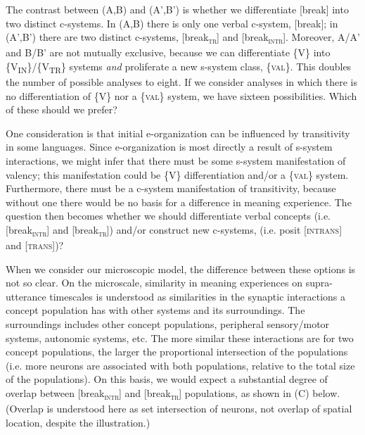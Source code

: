   The contrast between (A,B) and (A',B') is whether we differentiate [break] into two distinct c-systems. In (A,B) there is only one verbal c-system, [break]; in (A',B') there are two distinct c-systems, [break\textsc{\textsubscript{tr}}] and [break\textsc{\textsubscript{intr}}]. Moreover, A/A' and B/B' are not mutually exclusive, because we can differentiate \{V\} into \{V\textsubscript{IN}\}/\{V\textsubscript{TR}\} systems \textit{and} proliferate a new s-system class, \{\textsc{val}\}. This doubles the number of possible analyses to eight. If we consider analyses in which there is no differentiation of \{V\} nor a \{\textsc{val}\} system, we have sixteen possibilities. Which of these should we prefer? 

  One consideration is that initial e-organization can be influenced by transitivity in some languages. Since e-organization is most directly a result of s-system interactions, we might infer that there must be some s-system manifestation of valency; this manifestation could be \{V\} differentiation and/or a \{\textsc{val}\} system. Furthermore, there must be a c-system manifestation of transitivity, because without one there would be no basis for a difference in meaning experience. The question then becomes whether we should differentiate verbal concepts (i.e. [break\textsc{\textsubscript{intr}}] and [break\textsc{\textsubscript{tr}}]) and/or construct new c-systems, (i.e. posit [\textsc{intrans}] and [\textsc{trans}])?

  When we consider our microscopic model, the difference between these options is not so clear. On the microscale, similarity in meaning experiences on supra-utterance timescales is understood as similarities in the synaptic interactions a concept population has with other systems and its surroundings. The surroundings includes other concept populations, peripheral sensory/motor systems, autonomic systems, etc. The more similar these interactions are for two concept populations, the larger the proportional intersection of the populations (i.e. more neurons are associated with both populations, relative to the total size of the populations). On this basis, we would expect a substantial degree of overlap between [break\textsc{\textsubscript{intr}}] and [break\textsc{\textsubscript{tr}}] populations, as shown in (C) below. (Overlap is understood here as set intersection of neurons, not overlap of spatial location, despite the illustration.)

